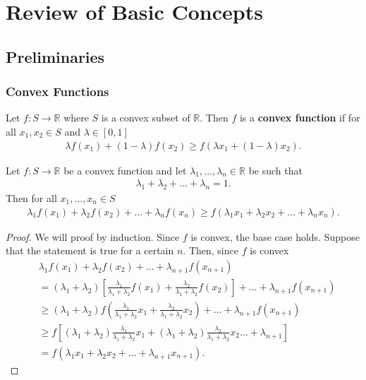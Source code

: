 \documentclass{memoir}
\begin{document}
\chapter{Review of Basic Concepts}
\section{Preliminaries}
\subsection{Convex Functions}
\begin{definition}
    Let $f:S\to \mathbb{R}$ where $S$ is a convex subset of $\mathbb{R}$. Then $f$ is a \textbf{convex function} if for all $x_1,x_2 \in S$ and $\lambda \in [0,1]$
    \begin{align*}
        \lambda f(x_1) + (1- \lambda)f(x_2) \ge f( \lambda x_1 + (1- \lambda) x_2).
    \end{align*}
\end{definition}

\begin{theorem}
    Let $f:S \to \mathbb{R}$ be a convex function and let $\lambda_1,\ldots,\lambda_n \in \mathbb{R}$ be such that
    \begin{align*}
        \lambda_1 + \lambda_2 + \ldots + \lambda_n = 1.
    \end{align*}
    Then for all $x_1,\ldots,x_n \in S$
    \begin{align*}
        \lambda_1 f(x_1) + \lambda_2 f(x_2) + \ldots + \lambda_n f(x_n) \ge f(\lambda_1 x_1 + \lambda_2 x_2 + \ldots + \lambda_n x_n).
    \end{align*}
\end{theorem}
\begin{proof}
    We will proof by induction. Since $f$ is convex, the base case holds. Suppose that the statement is true for a certain $n$. Then, since $f$ is convex
    \begin{align*}
        &\lambda_1 f(x_1) + \lambda_2 f(x_2) + \ldots + \lambda_{n+1} f(x_{n+1}) \\
        &= (\lambda_1+\lambda_2)\left[\frac{\lambda_1}{\lambda_1 + \lambda_2} f(x_1) + \frac{\lambda_2}{\lambda_1+\lambda_2}f(x_2)\right] + \ldots + \lambda_{n+1} f(x_{n+1})  \\
        &\ge (\lambda_1 + \lambda_2)f\left( \frac{\lambda_1}{\lambda_1 + \lambda_2} x_1 + \frac{\lambda_2}{\lambda_1+\lambda_2}x_2\right) + \ldots + \lambda_{n+1} f(x_{n+1}) \\
        &\ge f\left[(\lambda_1 + \lambda_2) \frac{\lambda_1}{\lambda_1 + \lambda_2} x_1 + (\lambda_1 + \lambda_2)\frac{\lambda_2}{\lambda_1+\lambda_2}x_2\ldots + \lambda_{n+1}\right] \\
        &= f(\lambda_1 x_1 + \lambda_2 x_2 + \ldots + \lambda_{n+1} x_{n+1}).
    \end{align*}
\end{proof}
\end{document}
